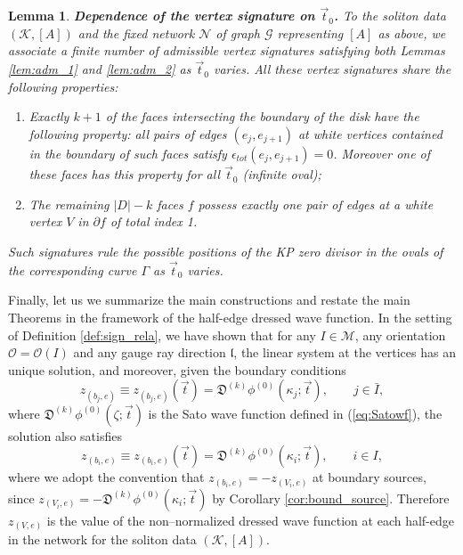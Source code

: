 \documentclass[11pt]{amsart}
\theoremstyle{plain}
\numberwithin{equation}{section}
\newtheorem{lemma}[theorem]{Lemma}
\begin{document}
\begin{lemma}\label{lem:signature}\textbf{Dependence of the vertex signature on $\vec t_0$.}
To the soliton data $(\mathcal K, [A])$ and the fixed network $\mathcal N$ of graph $\mathcal G$ representing $[A]$ as above, we associate a finite number of admissible vertex signatures satisfying both Lemmas \ref{lem:adm_1} and \ref{lem:adm_2} as $\vec t_0$ varies. All these vertex signatures share the following properties:
\begin{enumerate}
\item Exactly $k+1$ of the faces intersecting the boundary of the disk have the following property: all pairs of edges $(e_j, e_{j+1})$ at white vertices contained in the boundary of such faces satisfy $\epsilon_{tot} (e_j, e_{j+1})=0$. Moreover one of these faces has this property for all $\vec t_0$ (infinite oval); 
\item The remaining $|D|-k$ faces $f$ possess exactly one pair of edges at a white vertex $V$ in $\partial f$ of total index 1.
\end{enumerate}
Such signatures rule the possible positions of the KP zero divisor in the ovals of the corresponding curve $\Gamma$ as $\vec t_0$ varies.
\end{lemma}

Finally, let us we summarize the main constructions and restate the main Theorems in the framework of the half-edge dressed wave function.
In the setting of Definition \ref{def:sign_rela}, we have shown that for any $I \in{\mathcal M}$, any orientation $\mathcal O =\mathcal O(I)$ and any gauge ray direction $\mathfrak l$, the linear system at the vertices has an unique solution, and moreover, given the boundary conditions 
\begin{equation}\label{eq:lam_bound}
z_{(b_j,e)} \equiv z_{(b_j,e)} (\vec t) = {\mathfrak D}^{(k)}\phi^{(0)} (\kappa_j; \vec t), \quad\quad j\in \bar I,
\end{equation}
where ${\mathfrak D}^{(k)}\phi^{(0)} (\zeta; \vec t)$ is the Sato wave function defined in (\ref{eq:Satowf}), the solution also satisfies 
\[
z_{(b_i,e)} \equiv z_{(b_i,e)} (\vec t) = {\mathfrak D}^{(k)}\phi^{(0)} (\kappa_i; \vec t), \quad\quad i\in  I,
\]
where we adopt the convention that $z_{(b_i,e)}=-z_{(V_i,e)}$ at boundary sources, since $z_{(V_i,e)}= -{\mathfrak D}^{(k)}\phi^{(0)} (\kappa_i; \vec t)$ by Corollary \ref{cor:bound_source}.
Therefore $z_{(V,e)}$ is the value of the non--normalized dressed wave function at each half-edge in the network for the soliton data $(\mathcal K, [A])$.
\end{document}
